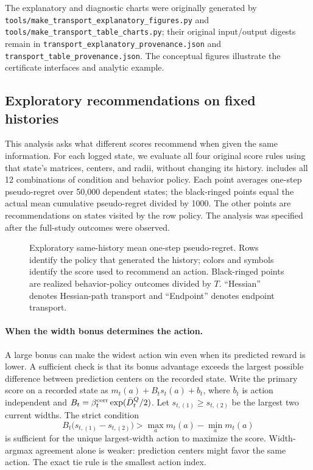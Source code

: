 The explanatory and diagnostic charts were originally generated by
\texttt{tools/make\_transport\_explanatory\_figures.py} and
\texttt{tools/make\_transport\_table\_charts.py}; their original input/output
digests remain in \texttt{transport\_explanatory\_provenance.json} and
\texttt{transport\_table\_provenance.json}.
The conceptual figures
illustrate the certificate interfaces and analytic example.

\subsection{Exploratory recommendations on fixed histories}

This analysis asks what different scores recommend when given the same
information.  For each logged state, we evaluate all four original score
rules using that state's matrices, centers, and radii, without changing its
history.
 includes all 12 combinations of
condition and behavior policy.  Each point averages one-step pseudo-regret
over 50,000 dependent states; the black-ringed points equal the actual mean cumulative
pseudo-regret divided by 1000.  The other points are recommendations on
states visited by the row policy.    The analysis was specified after the
full-study outcomes were observed.

\begin{figure}[p]
  \centering
  
  \caption{Exploratory same-history mean one-step pseudo-regret.  Rows identify
  the policy that generated the history; colors and symbols identify the score
  used to recommend an action.  Black-ringed points are realized behavior-policy
  outcomes divided by $T$. ``Hessian'' denotes Hessian-path transport and
  ``Endpoint'' denotes endpoint transport.}
  \label{fig:transport-followup-same-history}
\end{figure}

\paragraph{When the width bonus determines the action.}
A large bonus can make the widest action win even when its predicted reward
is lower.  A sufficient check is that its bonus advantage exceeds the largest
possible difference between prediction centers on the recorded state.
Write the primary score on a recorded state as
$m_t(a)+B_t s_t(a)+b_t$, where $b_t$ is action independent and
$B_t=\beta_t^{\rm corr}\exp(\bar D_t^Q/2)$.
Let $s_{t,(1)}\ge s_{t,(2)}$ be the largest two current widths.
The strict condition
\[
 B_t\bigl(s_{t,(1)}-s_{t,(2)}\bigr)
 >\max_a m_t(a)-\min_a m_t(a)
\]
is sufficient for the unique largest-width action to maximize the score.
Width-argmax agreement alone is weaker: prediction centers might favor the
same action.  The exact tie rule is the smallest action index.

